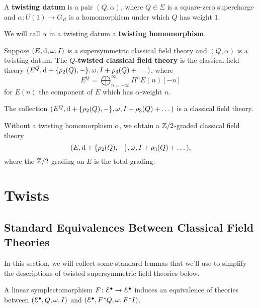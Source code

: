 \documentclass[10pt, oneside]{article}
\begin{document}
\begin{dfn}
A {\bf twisting datum} is a pair $(Q, \alpha)$, where $Q\in\Sigma$ is a square-zero supercharge and $\alpha\colon U(1)\rightarrow G_R$ is a homomorphism under which $Q$ has weight $1$.
\end{dfn}

We will call $\alpha$ in a twisting datum a {\bf twisting homomorphism}.

\begin{dfn}
Suppose $(E, {\rm d}, \omega, I)$ is a supersymmetric classical field theory and $(Q, \alpha)$ is a twisting datum. The {\bf $Q$-twisted classical field theory} is the classical field theory $(E^Q, {\rm d} + \{\rho_2(Q), -\}, \omega, I + \rho_3(Q) + \dots)$, where
\[E^Q = \bigoplus_{n=-\infty}^\infty \Pi^n E(n)[-n]\]
for $E(n)$ the component of $E$ which has $\alpha$-weight $n$.
\end{dfn}

\begin{prop}
The collection $(E^Q, {\rm d} + \{\rho_2(Q), -\}, \omega, I + \rho_3(Q) + \dots)$ is a classical field theory.
\end{prop}

\begin{remark}
Without a twisting homomorphism $\alpha$, we obtain a $\mathbb Z/2$-graded classical field theory
\[(E, {\rm d} + \{\rho_2(Q), -\}, \omega, I + \rho_3(Q) + \dots),\]
where the $\mathbb Z/2$-grading on $E$ is the total grading.
\end{remark}

\section{Twists}

\subsection{Standard Equivalences Between Classical Field Theories}
In this section, we will collect some standard lemmas that we'll use to simplify the descriptions of twisted supersymmetric field theories below.

\begin{lemma} \label{symplectomorphism_lemma}
A linear symplectomorphism $F \colon \mathcal{E}^\bullet \to \mathcal{E}^\bullet$ induces an equivalence of theories between $(\mathcal{E}^\bullet, Q, \omega, I)$ and $(\mathcal{E}^\bullet, F^*Q, \omega, F^*I)$.
\end{lemma}
\end{document}
